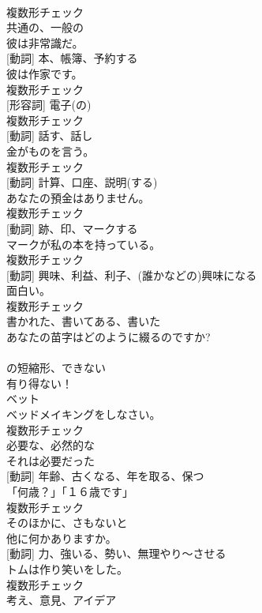 \documentclass[8pt]{extreport}
\begin{document}
\begin{CJK}{UTF8}{min}
\\	複数形チェック
\\	[形容詞]	共通の、一般の	
\\	彼は非常識だ。	
\\	[名詞] [動詞]	本、帳簿、予約する	
\\	彼は作家です。	
\\	複数形チェック
\\	[名詞] [形容詞]	電子(の)	
\\	複数形チェック
\\	[名詞] [動詞]	話す、話し	
\\	金がものを言う。	
\\	複数形チェック
\\	[名詞] [動詞]	計算、口座、説明(する)	
\\	あなたの預金はありません。	
\\	複数形チェック
\\	[名詞] [動詞]	跡、印、マークする	
\\	マークが私の本を持っている。	
\\	複数形チェック
\\	[名詞] [動詞]	興味、利益、利子、(誰かなどの)興味になる	
\\	面白い。	
\\	複数形チェック
\\	[形容詞]	書かれた、書いてある、書いた	
\\	あなたの苗字はどのように綴るのですか?	
\\	[短縮形]	
\\	の短縮形、できない	
\\	有り得ない！	
\\	[名詞]	ベット	
\\	ベッドメイキングをしなさい。	
\\	複数形チェック
\\	[形容詞]	必要な、必然的な	
\\	それは必要だった	
\\	[名詞] [動詞]	年齢、古くなる、年を取る、保つ	
\\	「何歳？」「１６歳です」	
\\	複数形チェック
\\	[副詞]	そのほかに、さもないと	
\\	他に何かありますか。	
\\	[名詞] [動詞]	力、強いる、勢い、無理やり～させる	
\\	トムは作り笑いをした。	
\\	複数形チェック
\\	[名詞]	考え、意見、アイデア	

\end{CJK}
\end{document}

